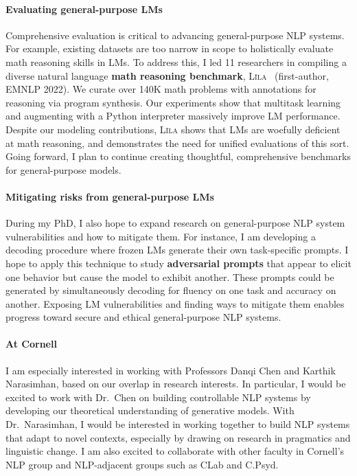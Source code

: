 \documentclass[11pt]{article}
\newcommand\lila{\textsc{L\={\i}la}\xspace}
\newcommand\inst{Cornell\xspace}
\begin{document}
\paragraph{Evaluating general-purpose LMs}

Comprehensive evaluation is critical to advancing general-purpose NLP systems.
For example, existing datasets are too narrow in scope 
to holistically evaluate math reasoning skills in LMs.
To address this, I led 11 researchers 
in compiling a diverse natural language 
\textbf{math reasoning benchmark}, 
\lila~\cite{Mishra2022LilaAU} (first-author, EMNLP 2022).
We curate over 140K math problems
with annotations for reasoning via program synthesis. 
Our experiments show that multitask learning 
and augmenting with a Python interpreter
massively improve LM performance. 
Despite our modeling contributions, \lila shows that LMs 
are woefully deficient at math reasoning,
and demonstrates the need for unified evaluations of this sort.
Going forward, I plan to continue creating thoughtful, comprehensive benchmarks 
for general-purpose models.

\paragraph{Mitigating risks from general-purpose LMs} 

During my PhD, I also hope to expand research 
on general-purpose NLP system vulnerabilities and how to mitigate them.
For instance, I am developing a decoding procedure where frozen LMs 
generate their own task-specific prompts.
I hope to apply this technique
to study \textbf{adversarial prompts}
that appear to elicit one behavior 
but cause the model to exhibit another.
These prompts could be generated by simultaneously 
decoding for fluency on one task and accuracy on another.
Exposing LM vulnerabilities and finding ways to mitigate them
enables progress 
toward secure and ethical general-purpose NLP systems. 

\paragraph{At \inst} 

I am especially interested in working 
with Professors Danqi Chen and Karthik Narasimhan,
based on our overlap in research interests. 
In particular, I would be excited to work with Dr.\ Chen 
on building controllable NLP systems 
by developing our theoretical understanding of generative models. 
With Dr.\ Narasimhan, I would be interested in working together 
to build NLP systems that adapt to novel contexts, 
especially by drawing on research in pragmatics and linguistic change. 
I am also excited to collaborate with other faculty in Cornell's NLP group
and NLP-adjacent groups such as CLab and C.Psyd.



\end{document}
